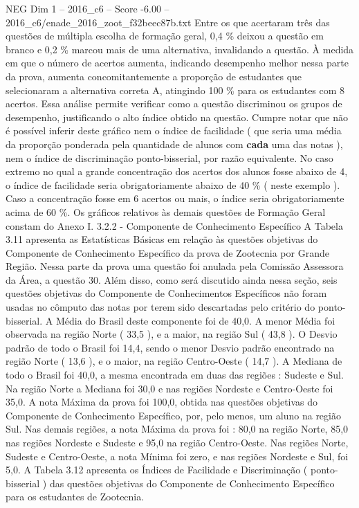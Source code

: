 \begin{textsample}{NEG Dim 1 – 2016\_c6 – Score -6.00 – 2016\_c6/enade\_2016\_zoot\_f32beec87b.txt}
Entre os que acertaram três das questões de múltipla escolha de formação geral, 0,4 \% deixou a questão em branco e 0,2 \% marcou mais de uma alternativa, invalidando a questão.
À medida em que o número de acertos aumenta, indicando desempenho melhor nessa parte da prova, aumenta concomitantemente a proporção de estudantes que selecionaram a alternativa correta A, atingindo 100 \% para os estudantes com 8 acertos.
Essa análise permite verificar como a questão discriminou os grupos de desempenho, justificando o alto índice obtido na questão.
Cumpre notar que não é possível inferir deste gráfico nem o índice de facilidade ( que seria uma média da proporção ponderada pela quantidade de alunos com \textbf{cada} uma das notas ), nem o índice de discriminação ponto-bisserial, por razão equivalente.
No caso extremo no qual a grande concentração dos acertos dos alunos fosse abaixo de 4, o índice de facilidade seria obrigatoriamente abaixo de 40 \% ( neste exemplo ).
Caso a concentração fosse em 6 acertos ou mais, o índice seria obrigatoriamente acima de 60 \%.
Os gráficos relativos às demais questões de Formação Geral constam do Anexo I. 3.2.2 - Componente de Conhecimento Específico A Tabela 3.11 apresenta as Estatísticas Básicas em relação às questões objetivas do Componente de Conhecimento Específico da prova de Zootecnia por Grande Região.
Nessa parte da prova uma questão foi anulada pela Comissão Assessora da Área, a questão 30.
Além disso, como será discutido ainda nessa seção, seis questões objetivas do Componente de Conhecimentos Específicos não foram usadas no cômputo das notas por terem sido descartadas pelo critério do ponto-bisserial.
A Média do Brasil deste componente foi de 40,0.
A menor Média foi observada na região Norte ( 33,5 ), e a maior, na região Sul ( 43,8 ).
O Desvio padrão de todo o Brasil foi 14,4, sendo o menor Desvio padrão encontrado na região Norte ( 13,6 ), e o maior, na região Centro-Oeste ( 14,7 ).
A Mediana de todo o Brasil foi 40,0, a mesma encontrada em duas das regiões : Sudeste e Sul.
Na região Norte a Mediana foi 30,0 e nas regiões Nordeste e Centro-Oeste foi 35,0.
A nota Máxima da prova foi 100,0, obtida nas questões objetivas do Componente de Conhecimento Específico, por, pelo menos, um aluno na região Sul.
Nas demais regiões, a nota Máxima da prova foi : 80,0 na região Norte, 85,0 nas regiões Nordeste e Sudeste e 95,0 na região Centro-Oeste.
Nas regiões Norte, Sudeste e Centro-Oeste, a nota Mínima foi zero, e nas regiões Nordeste e Sul, foi 5,0.
A Tabela 3.12 apresenta os Índices de Facilidade e Discriminação ( ponto-bisserial ) das questões objetivas do Componente de Conhecimento Específico para os estudantes de Zootecnia.

\end{textsample}
